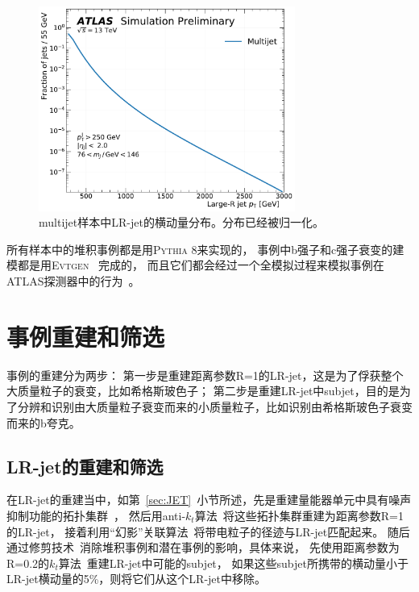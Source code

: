 \begin{figure}
  \begin{center}
    \includegraphics[width=0.75\textwidth]{figuresXbb/samples/pt_norm.pdf}
  \end{center}
  \caption{
  multijet样本中LR-jet的横动量分布。分布已经被归一化。
  }
    \label{fig:bkg-pt}
\end{figure}

所有样本中的堆积事例都是用\textsc{Pythia 8}来实现的，
事例中b强子和c强子衰变的建模都是用\textsc{Evtgen}~\cite{Lange:2001uf} 完成的，
而且它们都会经过一个全模拟过程来模拟事例在ATLAS探测器中的行为~\cite{SOFT-2010-01}。



\section{事例重建和筛选}
\label{sec:XbbOR}

事例的重建分为两步：
第一步是重建距离参数R=1的LR-jet，这是为了俘获整个大质量粒子的衰变，比如希格斯玻色子；
第二步是重建LR-jet中subjet，目的是为了分辨和识别由大质量粒子衰变而来的小质量粒子，比如识别由希格斯玻色子衰变而来的b夸克。

\subsection{LR-jet的重建和筛选}
\label{sec:XbbORLR}

在LR-jet的重建当中，如第~\ref{sec:JET}~小节所述，先是重建量能器单元中具有噪声抑制功能的拓扑集群~\cite{PERF-2014-07}，
然后用anti-$k_t$算法~\cite{Cacciari:2008gp}将这些拓扑集群重建为距离参数R=1的LR-jet，
接着利用“幻影”关联算法~\cite{Cacciari:2008gn}将带电粒子的径迹与LR-jet匹配起来。
随后通过修剪技术~\cite{Krohn:2009th}消除堆积事例和潜在事例的影响，具体来说，
先使用距离参数为R=0.2的$k_t$算法~\cite{KTA}重建LR-jet中可能的subjet，
如果这些subjet所携带的横动量小于LR-jet横动量的5\%，则将它们从这个LR-jet中移除。

